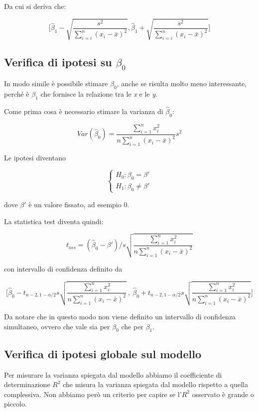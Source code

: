 Da cui si deriva che:

$$
\Bigg[ \hat{\beta}_1 -  \sqrt{\frac{s^2}{\sum_{i=i}^{n} (x_i - \bar{x})^2}} , \hat{\beta}_1 + \sqrt{\frac{s^2}{\sum_{i=i}^{n} (x_i - \bar{x})^2}}  \Bigg]
$$

\subsection{Verifica di ipotesi su $ \beta_0 $}\label{verifica-di-ipotesi-su-beta0}

In modo simile è possibile stimare $ \beta_0 $, anche se risulta molto meno
interessante, perché è $ \beta_1 $ che fornisce la relazione tra le \emph{x} e
le \emph{y}.

Come prima cosa è necessario stimare la varianza di $ \hat{\beta}_0 $:

$$
Var(\hat{\beta}_0) = \frac{\sum_{i=1}^{n} x_{i}^2}{n \sum_{i=1}^{n} (x_i - \bar{x})^2}s^2
$$

Le ipotesi diventano

$$
\begin{cases}
H_0 : \beta_0 = \beta' \\
H_1 : \beta_0 \neq \beta' 
\end{cases}
$$

dove $ \beta' $ è un valore fissato, ad esempio 0.

La statistica test diventa quindi:

$$
t_{oss}  = (\hat{\beta}_0 - \beta') \Bigg/ s \sqrt{\frac{\sum_{i=1}^{n} x_{i}^2}{n \sum_{i=1}^{n} (x_i - \bar{x})^2}}
$$

con intervallo di confidenza definito da

$$
\Bigg[ \hat{\beta}_0 - t_{n-2, 1-\alpha/2} s \sqrt{\frac{\sum_{i=1}^{n} x_{i}^2}{n \sum_{i=1}^{n} (x_i - \bar{x})^2}} \:,\: \hat{\beta}_0 + t_{n-2, 1-\alpha/2} s \sqrt{\frac{\sum_{i=1}^{n} x_{i}^2}{n \sum_{i=1}^{n} (x_i - \bar{x})^2}}\Bigg]
$$

Da notare che in questo modo non viene definito un intervallo di confidenza simultaneo, ovvero che vale sia per $ \beta_0 $ che per $ \beta_1 $.


\subsection{Verifica di ipotesi globale sul modello}\label{verifica-di-ipotesi-globale-sul-modello}

Per misurare la varianza spiegata dal modello abbiamo il coefficiente di
determinazione $R^2$ che misura la varianza spiegata dal modello
rispetto a quella complessiva. Non abbiamo però un criterio per capire
se l'$R^{2}$ osservato è grande o piccolo.

